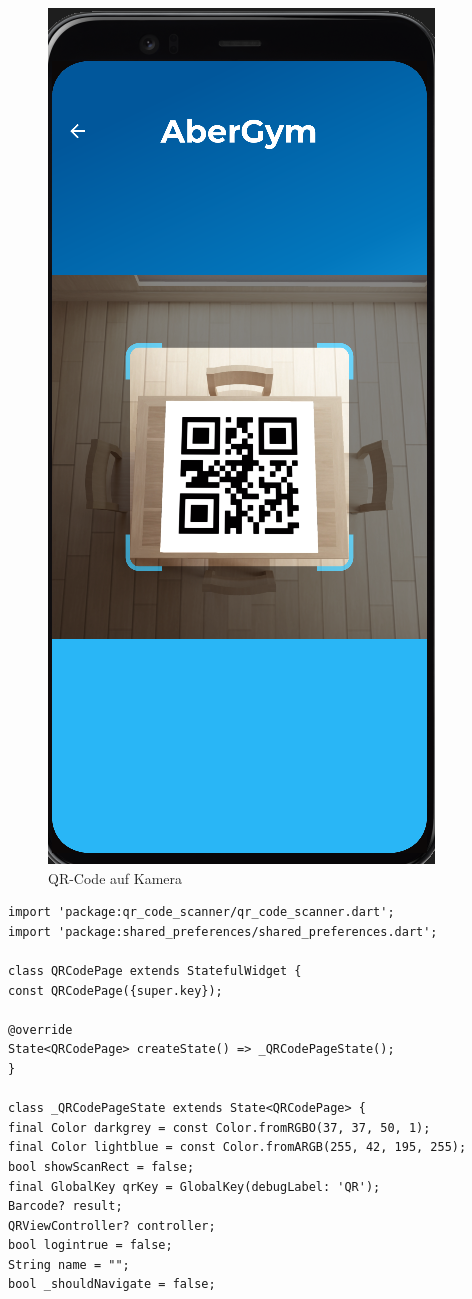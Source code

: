 \begin{figure}[H]
    \centering
    \includegraphics[scale=0.3]{pics/QR-CodeCamera.png}
    \caption{QR-Code auf Kamera}
\end{figure}
\pagebreak
\begin{lstlisting}[caption=QR-Code Seite erstellen,label=lst:impl:frontend:qrcode]
import 'package:qr_code_scanner/qr_code_scanner.dart';
import 'package:shared_preferences/shared_preferences.dart';

class QRCodePage extends StatefulWidget {
const QRCodePage({super.key});

@override
State<QRCodePage> createState() => _QRCodePageState();
}

class _QRCodePageState extends State<QRCodePage> {
final Color darkgrey = const Color.fromRGBO(37, 37, 50, 1);
final Color lightblue = const Color.fromARGB(255, 42, 195, 255);
bool showScanRect = false;
final GlobalKey qrKey = GlobalKey(debugLabel: 'QR');
Barcode? result;
QRViewController? controller;
bool logintrue = false;
String name = "";
bool _shouldNavigate = false;
\end{lstlisting}

